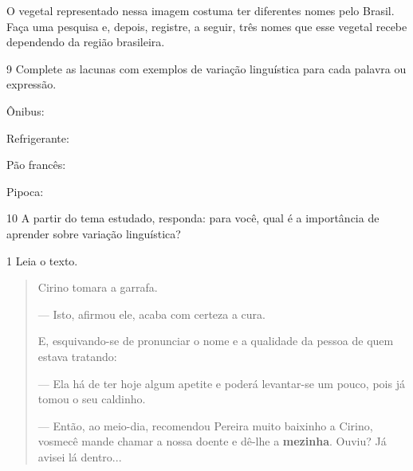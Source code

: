 O vegetal representado nessa imagem costuma ter diferentes nomes pelo Brasil.
Faça uma pesquisa e, depois, registre, a seguir, três nomes que esse vegetal recebe dependendo da região brasileira.


\num{9} Complete as lacunas com exemplos de variação linguística para cada palavra ou expressão.

\begin{escolha}
\item Ônibus: 

\item Refrigerante: 

\item Pão francês:

\item Pipoca: 
\end{escolha}


\num{10} A partir do tema estudado, responda: para você, qual é a importância de
aprender sobre variação linguística?



\num{1} Leia o texto.

\begin{quote}
Cirino tomara a garrafa.

— Isto, afirmou ele, acaba com certeza a cura.

E, esquivando-se de pronunciar o nome e a qualidade da pessoa de quem
estava tratando:

— Ela há de ter hoje algum apetite e poderá levantar-se um pouco, pois
já tomou o seu caldinho.

— Então, ao meio-dia, recomendou Pereira muito baixinho a Cirino,
vosmecê mande chamar a nossa doente e dê-lhe a \textbf{mezinha}. Ouviu?
Já avisei lá dentro...

\end{quote}

